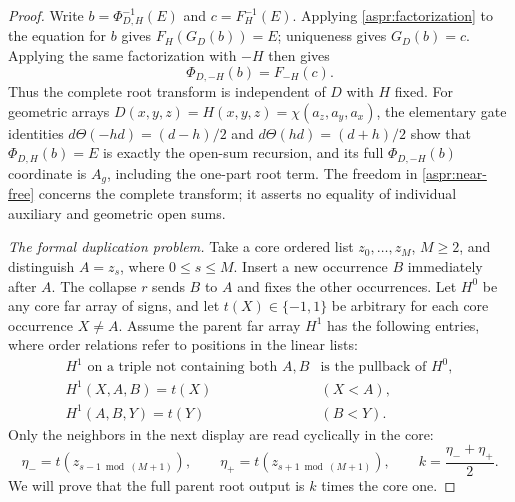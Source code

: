 \begin{proof}
Write $b=\Phi_{D,H}^{-1}(E)$ and $c=F_H^{-1}(E)$. Applying
\eqref{aspr:factorization} to the equation for $b$ gives
$F_H(G_D(b))=E$; uniqueness gives $G_D(b)=c$. Applying the same
factorization with $-H$ then gives
\begin{equation}\label{aspr:near-free}
\Phi_{D,-H}(b)=F_{-H}(c).
\end{equation}
Thus the complete root transform is independent of $D$ with $H$ fixed.
For geometric arrays
$D(x,y,z)=H(x,y,z)=\chi(a_z,a_y,a_x)$, the elementary gate identities
$d\Theta(-hd)=(d-h)/2$ and $d\Theta(hd)=(d+h)/2$ show that
$\Phi_{D,H}(b)=E$ is exactly the open-sum recursion, and its full
$\Phi_{D,-H}(b)$ coordinate is $A_g$, including the one-part root term.
The freedom in \eqref{aspr:near-free} concerns the complete transform;
it asserts no equality of individual auxiliary and geometric open sums.

\emph{The formal duplication problem.}
Take a core ordered list $z_0,\ldots,z_M$, $M\geq2$, and distinguish
$A=z_s$, where $0\leq s\leq M$. Insert a new occurrence $B$ immediately
after $A$. The collapse $r$ sends $B$ to $A$ and fixes the other
occurrences. Let $H^0$ be any core far array of signs, and let
$t(X)\in\{-1,1\}$ be arbitrary for each core occurrence $X\ne A$.
Assume the parent far array $H^1$ has the following entries, where order
relations refer to positions in the linear lists:
\begin{equation}\label{aspr:far-data}
\begin{array}{ll}
H^1\text{ on a triple not containing both }A,B
   &\text{is the pullback of }H^0,\\
H^1(X,A,B)=t(X)&(X<A),\\
H^1(A,B,Y)=t(Y)&(B<Y).
\end{array}
\end{equation}
Only the neighbors in the next display are read cyclically in the core:
\begin{equation}\label{aspr:neighbor-data}
\eta_-=t(z_{s-1\bmod(M+1)}),\qquad
\eta_+=t(z_{s+1\bmod(M+1)}),\qquad
k=\frac{\eta_-+\eta_+}{2}.
\end{equation}
We will prove that the full parent root output is $k$ times the core one.


\end{proof}
